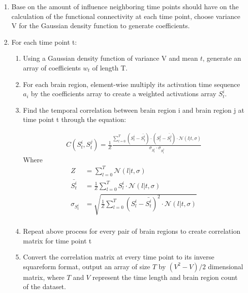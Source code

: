 \documentclass[11pt]{article}
\begin{document}
\begin{enumerate}
\item Base on the amount of influence neighboring time points should have on the calculation of the functional connectivity at each time point, choose variance V for the Gaussian density function to generate coefficients.

\item For each time point t:
\begin{enumerate}
\item Using a Gaussian density function of variance V and mean $t$, generate an array of coefficients $w_t$ of length T.

\item For each brain region, element-wise multiply its activation time sequence $a_i$ by the coefficients array to create a weighted activations array $S^i_t$.

\item Find the temporal correlation between brain region i and brain region j at time point t through the equation:

\begin{align*}
C(S^i_t,S^j_t) = \frac{1}{Z}\frac{\sum_{l=0}^T (S_l^i - \bar{S^i_t})\cdot(S^j_l - \bar{S^j_t})\cdot \mathcal{N}(l|t,\sigma)}{\sigma_{S_t^i} \cdot \sigma_{S_t^j}}
\end{align*}
Where
\begin{align*}
Z &= \sum_{l=0}^T \mathcal{N}(l|t,\sigma)\\
\bar{S^i_t} &=\frac{1}{Z} \sum_{l=0}^T S^i_l \cdot \mathcal{N}(l|t,\sigma)\\
\sigma_{S_t^i} &=\sqrt{ \frac{1}{Z}\sum_{l=0}^T (S_l^i-\bar{S_t^i})^2 \cdot \mathcal{N}(l|t,\sigma)}\\
\end{align*}
\item Repeat above process for every pair of brain regions to create correlation matrix for time point t
\item Convert the correlation matrix at every time point to its inverse squareform format, output an array of size $T$ by $(V^2-V)/2$ dimensional matrix, where $T$ and $V$ represent the time length and brain region count of the dataset.
\end{enumerate}
\end{enumerate}
\end{document}
